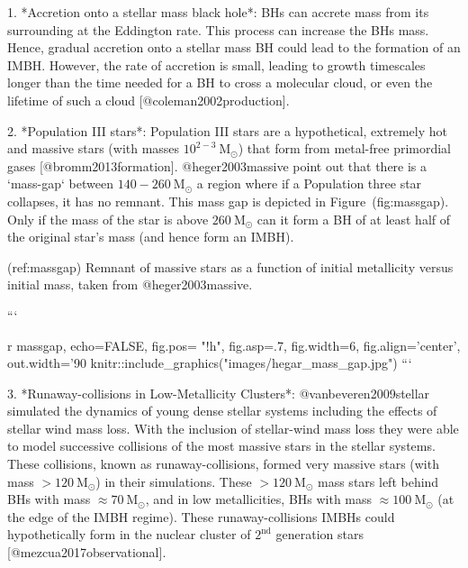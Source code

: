 {{{{{{{{{{{1. *Accretion onto a stellar mass black hole*:
    BHs can accrete mass from its surrounding at the Eddington rate.
    This process can increase the BHs mass. Hence, gradual accretion
    onto a stellar mass BH could lead to the formation of an IMBH.
    However, the rate of accretion is small, leading to growth timescales
    longer than the time needed for a BH to cross a molecular
    cloud, or even the lifetime of such a cloud [@coleman2002production].


2. *Population III stars*:
    Population III stars are a hypothetical, extremely hot and massive stars
    (with masses $10^{2-3}\ \text{M}_{\odot}$) that form from metal-free
    primordial gases [@bromm2013formation]. @heger2003massive point out that
    there is a `mass-gap` between $140-260 \ \text{M}_{\odot}$ a region
    where if a Population three star collapses, it has no remnant. This mass
    gap is depicted in Figure~\@ref(fig:massgap). Only if the mass of the
    star is above $260 \ \text{M}_{\odot}$ can it form a BH of at
    least half of the original star's mass (and hence form an IMBH).

(ref:massgap) Remnant of massive stars as a function of initial metallicity versus initial mass, taken from @heger2003massive.

```{r massgap, echo=FALSE, fig.pos= "!h", fig.asp=.7, fig.width=6, fig.align='center', out.width='90%
knitr::include_graphics("images/hegar_mass_gap.jpg")
```

3. *Runaway-collisions in Low-Metallicity Clusters*:
   @vanbeveren2009stellar simulated the dynamics of young dense stellar
   systems including the effects of stellar wind mass loss. With the
   inclusion of stellar-wind mass loss they were able to model
   successive collisions of the most massive stars in the stellar
   systems. These collisions, known as runaway-collisions, formed very
   massive stars (with mass $> 120 \ \text{M}_{\odot}$) in their
   simulations. These $> 120 \ \text{M}_{\odot}$ mass stars left behind
   BHs with mass $\approx 70\ \text{M}_{\odot}$, and in low metallicities,
   BHs with mass $\approx 100\ \text{M}_{\odot}$ (at the edge of the IMBH
   regime). These runaway-collisions IMBHs could hypothetically form in
   the nuclear cluster of $2^\text{nd}$ generation stars
   [@mezcua2017observational].


}}}}}}}}}}}}
